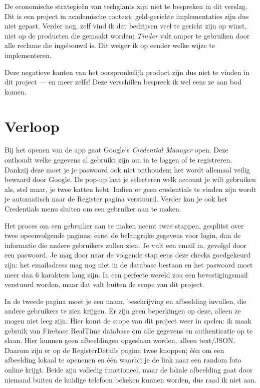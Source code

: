 \documentclass{article}
\begin{document}
De economische strategieën van techgiants zijn niet te bespreken in dit verslag. Dit is een project in academische context, geld-gerichte implementaties zijn dus niet gepast.
Verder nog, zelf vind ik dat bedrijven veel te gericht zijn op winst, niet op de producten die gemaakt worden; \textit{Tinder} valt amper te gebruiken door alle reclame die ingebouwd is. Dit weiger ik op eender welke wijze te implementeren.

Deze negatieve kanten van het oorspronkelijk product zijn dus niet te vinden in dit project --- en meer zelfs! Deze verschillen bespreek ik wel eens ze aan bod komen.


\section{Verloop}

Bij het openen van de app gaat Google's \textit{Credential Manager} open. Deze onthoudt welke gegevens al gebruikt zijn om in te loggen of te registreren.
Dankzij deze moet je je paswoord ook niet onthouden; het wordt allemaal veilig bewaard door Google.
De pop-up laat je selecteren welk account je wilt gebruiken als, stel maar, je twee katten hebt. Indien er geen credentials te vinden zijn wordt je automatisch naar de Register pagina verstuurd.
Verder kan je ook het Credentials menu sluiten om een gebruiker aan te maken.

Het proces om een gebruiker aan te maken neemt twee stappen, gesplitst over twee opeenvolgende paginas; eerst de belangrijke gegevens voor login, dan de informatie die andere gebruikers zullen zien.
Je vult een email in, gevolgd door een paswoord. Je mag door naar de volgende stap eens deze checks goedgekeurd zijn: het emailadress mag nog niet in de database bestaan en het paswoord moet meer dan 6 karakters lang zijn.
In een perfecte wereld zou een bevestigingsmail verstuurd worden, maar dat valt buiten de scope van dit project.

In de tweede pagina moet je een naam, beschrijving en afbeelding invullen, die andere gebruikers te zien krijgen. Er zijn geen beperkingen op deze, alleen ze mogen niet leeg zijn.
Hier komt de scope van dit project weer in spelen: ik maak gebruik van Firebase RealTime database om alle gegevens en authenticatie op te slaan. Hier kunnen geen afbeeldingen opgeslaan worden, alleen text/JSON.
Daarom zijn er op de RegisterDetails pagina twee knoppen; één om een afbeelding lokaal te openenen en één waarbij je de link naar een random foto online krijgt. 
Beide zijn volledig functioneel, maar de lokale afbeelding gaat door niemand buiten de huidige telefoon bekeken kunnen worden, dus raad ik niet aan.
\end{document}
